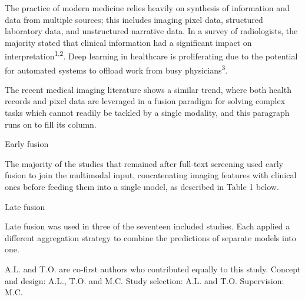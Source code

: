 \documentclass[twocolumn,10pt]{article}
\newcommand{\sub}[1]{\par\vspace{1.2\baselineskip}\noindent #1\par\noindent\ignorespaces}
\begin{document}
\begingroup
\renewcommand{\thefootnote}{}
\endgroup
{}\par
\noindent The practice of modern medicine relies heavily on synthesis of information and data from multiple sources; this includes imaging pixel data, structured laboratory data, and unstructured narrative data. In a survey of radiologists, the majority stated that clinical information had a significant impact on interpretation\textsuperscript{1,2}. Deep learning in healthcare is proliferating due to the potential for automated systems to offload work from busy physicians\textsuperscript{3}.

The recent medical imaging literature shows a similar trend, where both health records and pixel data are leveraged in a fusion paradigm for solving complex tasks which cannot readily be tackled by a single modality, and this paragraph runs on to fill its column.
\sub{Early fusion}
The majority of the studies that remained after full-text screening used early fusion to join the multimodal input, concatenating imaging features with clinical ones before feeding them into a single model, as described in Table 1 below.
\sub{Late fusion}
Late fusion was used in three of the seventeen included studies. Each applied a different aggregation strategy to combine the predictions of separate models into one.

\par
\noindent A.L. and T.O. are co-first authors who contributed equally to this study. Concept and design: A.L., T.O. and M.C. Study selection: A.L. and T.O. Supervision: M.C.
\end{document}
